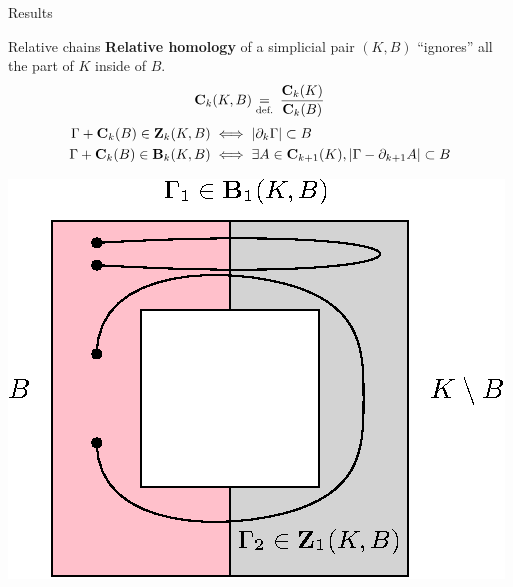 \begin{frame}{Results}
		\begin{center}
			\hfill
		\end{center}
\end{frame}

\begin{frame}{Relative chains}
	\textbf{Relative homology} of a simplicial pair $(K, B)$  ``ignores'' all the part of $K$ inside of $B$.
	\pause
	\[
	\mathbf{C}_k(K, B) \underset{\text{def.}}{=} \: \frac{\mathbf{C}_k(K)}{\mathbf{C}_k(B)} 
	\]
	\pause
	\[
	\begin{aligned}
		\Gamma + \mathbf{C}_k(B) \in \mathbf{Z}_{k}(K, B) &\iff | \partial_k\Gamma | \subset B\\
		\Gamma + \mathbf{C}_k(B) \in \mathbf{B}_k(K, B) &\iff  \exists A \in \mathbf{C}_{k+1}(K), |\Gamma - \partial_{k+1} A| \subset B
	\end{aligned}
	\]
	
	\begin{center}
		\includegraphics[width=0.4\linewidth]{course/relative_homology}
	\end{center}
\end{frame}


